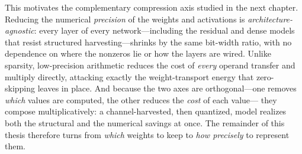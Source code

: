 This motivates the complementary compression axis studied in the next chapter.
Reducing the numerical \emph{precision} of the weights and activations is
\emph{architecture-agnostic}: every layer of every network---including the residual
and dense models that resist structured harvesting---shrinks by the same bit-width
ratio, with no dependence on where the nonzeros lie or how the layers are wired.
Unlike sparsity, low-precision arithmetic reduces the cost of \emph{every} operand
transfer and multiply directly, attacking exactly the weight-transport energy that
zero-skipping leaves in place. And because the two axes are orthogonal---one removes
\emph{which} values are computed, the other reduces the \emph{cost} of each value---
they compose multiplicatively: a channel-harvested, then quantized, model realizes
both the structural and the numerical savings at once. The remainder of this thesis
therefore turns from \emph{which} weights to keep to \emph{how precisely} to
represent them.
